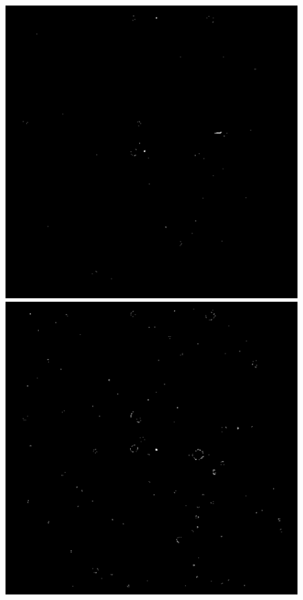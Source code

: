 \begin{figure}
  \includegraphics[width=\linewidth]{Figures/NEATImageDiff1.pdf}
\endminipage\hfill
{}
  \includegraphics[width=\linewidth]{Figures/NEATImageDiff2.pdf}

\end{figure}
